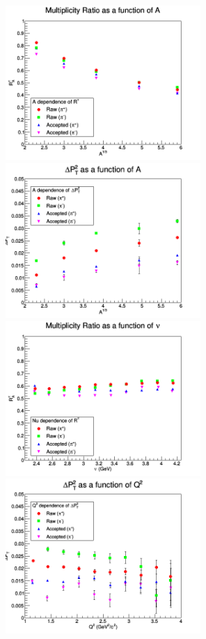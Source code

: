 \begin{figure}[p]
\centering
\includegraphics[width=7.4cm] {new-fig/50_Adep_Ratio_A13_1.png} 
\includegraphics[width=7.4cm] {new-fig/54_Adep_DePts_A13_1.png} 
\includegraphics[width=7.4cm] {new-fig/51_Ndep_Ratio_Nu_1.png} 
\includegraphics[width=7.4cm] {new-fig/56_Qdep_DePts_Q2_1.png} 

\end{figure}
